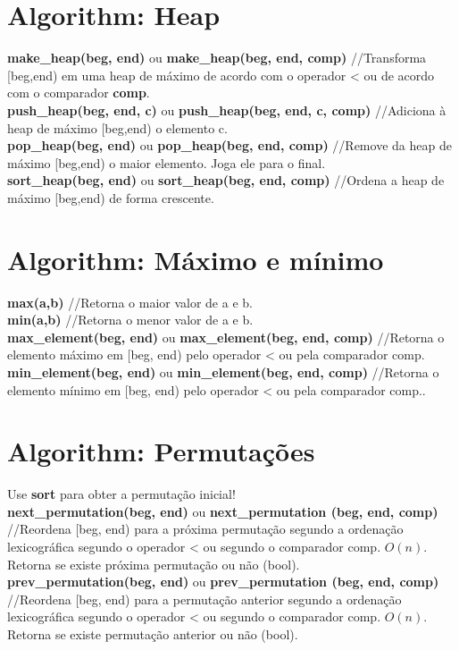 \begin{multicols}{2}
\section{Algorithm: Heap}
\textbf{make\_heap(beg, end)} ou \textbf{make\_heap(beg, end, comp)} //Transforma [beg,end) em uma heap de máximo de acordo com o operador < ou de acordo com o comparador \textbf{comp}.\\
\textbf{push\_heap(beg, end, c)} ou \textbf{push\_heap(beg, end, c, comp)} //Adiciona à heap de máximo [beg,end) o elemento c.\\
\textbf{pop\_heap(beg, end)} ou \textbf{pop\_heap(beg, end, comp)} //Remove da heap de máximo [beg,end) o maior elemento. Joga ele para o final.\\
\textbf{sort\_heap(beg, end)} ou \textbf{sort\_heap(beg, end, comp)} //Ordena a heap de máximo [beg,end) de forma crescente.

\section{Algorithm: Máximo e mínimo}
\textbf{max(a,b)} //Retorna o maior valor de a e b.\\
\textbf{min(a,b)} //Retorna o menor valor de a e b.\\
\textbf{max\_element(beg, end)} ou \textbf{max\_element(beg, end, comp)} //Retorna o elemento máximo em [beg, end) pelo operador < ou pela comparador comp.\\
\textbf{min\_element(beg, end)} ou \textbf{min\_element(beg, end, comp)} //Retorna o elemento mínimo em [beg, end) pelo operador < ou pela comparador comp..

\section{Algorithm: Permutações}
Use \textbf{sort} para obter a permutação inicial!\\
\textbf{next\_permutation(beg, end)} ou \textbf{next\_permutation (beg, end, comp)} //Reordena [beg, end) para a próxima permutação segundo a ordenação lexicográfica segundo o operador < ou segundo o comparador comp. $O(n)$. Retorna se existe próxima permutação ou não (bool).\\
\textbf{prev\_permutation(beg, end)} ou \textbf{prev\_permutation (beg, end, comp)} //Reordena [beg, end) para a permutação anterior segundo a ordenação lexicográfica segundo o operador < ou segundo o comparador comp. $O(n)$. Retorna se existe permutação anterior ou não (bool).


\end{multicols}
